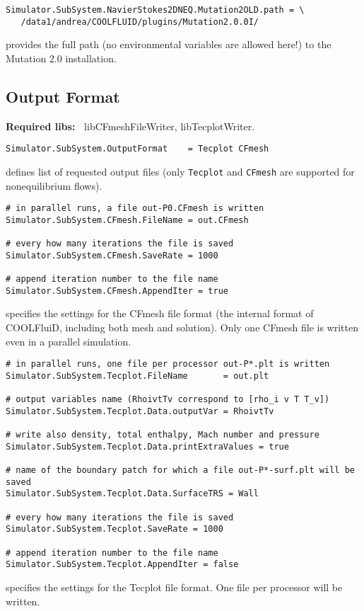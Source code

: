 \documentclass[11pt]{article}
\begin{document}
\begin{verbatim}
Simulator.SubSystem.NavierStokes2DNEQ.Mutation2OLD.path = \
   /data1/andrea/COOLFLUID/plugins/Mutation2.0.0I/
\end{verbatim}
provides the full path (no environmental variables are allowed here!) to the Mutation 2.0 installation.

\subsection{Output Format}

{\bf Required libs:~} libCFmeshFileWriter, libTecplotWriter.

\begin{verbatim}
Simulator.SubSystem.OutputFormat    = Tecplot CFmesh
\end{verbatim}
defines list of requested output files (only {\tt Tecplot} and {\tt CFmesh} are supported for nonequilibrium flows).

\begin{verbatim}
# in parallel runs, a file out-P0.CFmesh is written
Simulator.SubSystem.CFmesh.FileName = out.CFmesh  

# every how many iterations the file is saved  
Simulator.SubSystem.CFmesh.SaveRate = 1000

# append iteration number to the file name  	
Simulator.SubSystem.CFmesh.AppendIter = true
\end{verbatim}
specifies the settings for the CFmesh file format (the internal format of COOLFluiD, including both mesh and solution).
Only one CFmesh file is written even in a parallel simulation. 

\begin{verbatim}
# in parallel runs, one file per processor out-P*.plt is written
Simulator.SubSystem.Tecplot.FileName       = out.plt

# output variables name (RhoivtTv correspond to [rho_i v T T_v])
Simulator.SubSystem.Tecplot.Data.outputVar = RhoivtTv

# write also density, total enthalpy, Mach number and pressure
Simulator.SubSystem.Tecplot.Data.printExtraValues = true  

# name of the boundary patch for which a file out-P*-surf.plt will be saved   
Simulator.SubSystem.Tecplot.Data.SurfaceTRS = Wall   

# every how many iterations the file is saved  
Simulator.SubSystem.Tecplot.SaveRate = 1000

# append iteration number to the file name
Simulator.SubSystem.Tecplot.AppendIter = false       
\end{verbatim}
specifies the settings for the Tecplot file format. One file per processor will be written. 
\end{document}
